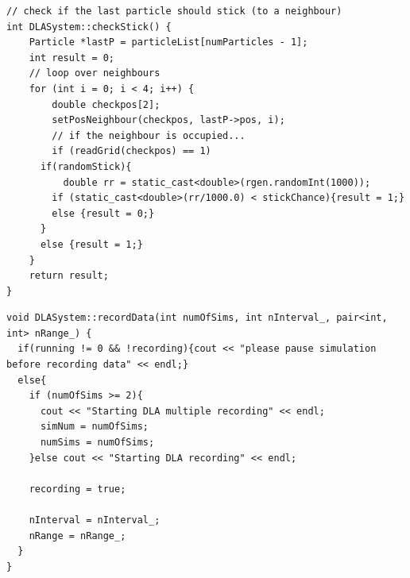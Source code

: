 \documentclass[10pt, twocolumn]{article} %
\begin{document}
\begin{lstlisting}
// check if the last particle should stick (to a neighbour)
int DLASystem::checkStick() {
	Particle *lastP = particleList[numParticles - 1];
	int result = 0;
	// loop over neighbours
	for (int i = 0; i < 4; i++) {
		double checkpos[2];
		setPosNeighbour(checkpos, lastP->pos, i);
		// if the neighbour is occupied...
		if (readGrid(checkpos) == 1)
      if(randomStick){
	      double rr = static_cast<double>(rgen.randomInt(1000));
        if (static_cast<double>(rr/1000.0) < stickChance){result = 1;}
        else {result = 0;}
      }
      else {result = 1;}
	}
	return result;
}
\end{lstlisting}

\begin{lstlisting}
void DLASystem::recordData(int numOfSims, int nInterval_, pair<int, int> nRange_) {
  if(running != 0 && !recording){cout << "please pause simulation before recording data" << endl;}
  else{ 
    if (numOfSims >= 2){
      cout << "Starting DLA multiple recording" << endl;
      simNum = numOfSims;
      numSims = numOfSims;
    }else cout << "Starting DLA recording" << endl;
    
    recording = true;

    nInterval = nInterval_;
    nRange = nRange_;
  }
}
\end{lstlisting}
\end{document}

